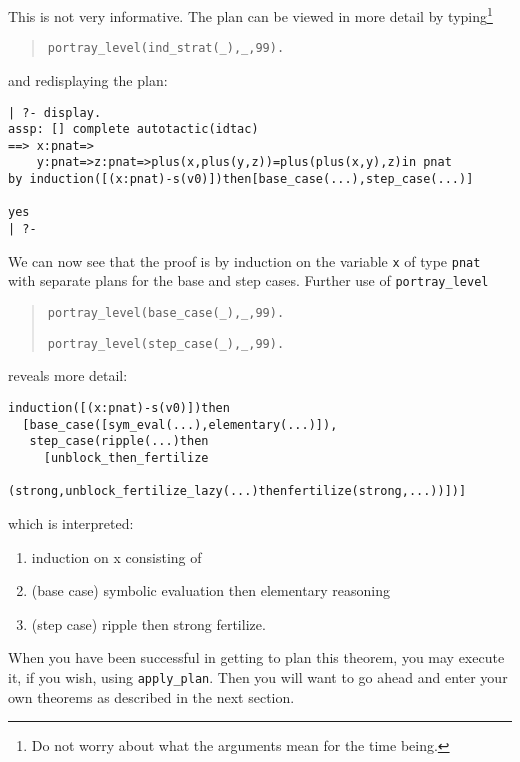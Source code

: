 \documentclass{article}
\begin{document}
This is not very informative. The plan can be viewed in more detail by
typing\footnote{Do not worry about what the arguments mean for the time being.}
%
\begin{verse}
{\tt portray\_level(ind\_strat(\_),\_,99).}
\end{verse}
%
and redisplaying the plan:
%
\begin{verbatim}
| ?- display.
assp: [] complete autotactic(idtac) 
==> x:pnat=>
    y:pnat=>z:pnat=>plus(x,plus(y,z))=plus(plus(x,y),z)in pnat
by induction([(x:pnat)-s(v0)])then[base_case(...),step_case(...)]

yes
| ?- 
\end{verbatim}
%
We can now see that the proof is by induction on the variable {\tt x} of type
{\tt pnat} with separate plans for the base and step cases. Further use of
{\tt portray\_level}
%
\begin{verse}
{\tt portray\_level(base\_case(\_),\_,99).}

{\tt portray\_level(step\_case(\_),\_,99).}
\end{verse}
%
reveals more detail:
%
\begin{verbatim}
induction([(x:pnat)-s(v0)])then
  [base_case([sym_eval(...),elementary(...)]),
   step_case(ripple(...)then
     [unblock_then_fertilize
        (strong,unblock_fertilize_lazy(...)thenfertilize(strong,...))])]
\end{verbatim}
%
which is interpreted:
%
\begin{enumerate}
\item induction on x consisting of
\item (base case) symbolic evaluation
then elementary reasoning
\item (step case) ripple
then strong fertilize.
\end{enumerate}
%

When you have been successful in getting \clam to plan this
theorem, you may execute it, if you wish, using {\tt apply\_plan}.
Then you will want to go ahead and enter your own theorems as
described in the next section.

\end{document}
